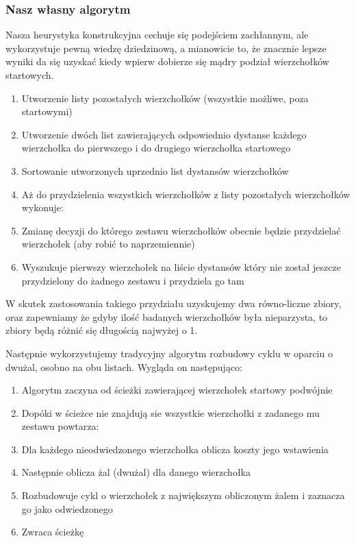 \documentclass[11pt]{article}
\begin{document}
\subsubsection{Nasz własny algorytm}\label{subsubsec:nasz-wasny-algorytm}

Nasza heurystyka konstrukcyjna cechuje się podejściem zachłannym, ale wykorzystuje pewną wiedzę dziedzinową,
a mianowicie to, że znacznie lepsze wyniki da się uzyskać kiedy wpierw dobierze się mądry podział wierzchołków startowych.

\begin{enumerate}
    \item Utworzenie listy pozostałych wierzchołków (wszystkie możliwe, poza startowymi)
    \item Utworzenie dwóch list zawierających odpowiednio dystanse każdego wierzchołka do pierwszego i do drugiego wierzchołka startowego
    \item Sortowanie utworzonych uprzednio list dystansów wierzchołków
    \item Aż do przydzielenia wszystkich wierzchołków z listy pozostałych wierzchołków wykonuje:
    \item Zmianę decyzji do którego zestawu wierzchołków obecnie będzie przydzielać wierzchołek (aby robić to naprzemiennie)
    \item Wyszukuje pierwszy wierzchołek na liście dystansów który nie został jeszcze przydzielony do żadnego zestawu i przydziela go tam
\end{enumerate}

W skutek zastosowania takiego przydziału uzyskujemy dwa równo-liczne zbiory, oraz zapewniamy że gdyby ilość badanych wierzchołków była nieparzysta, to zbiory będą różnić się długością najwyżej o 1.

Następnie wykorzystujemy tradycyjny algorytm rozbudowy cyklu w oparciu o dwużal, osobno na obu listach.
Wygląda on następująco:

\begin{enumerate}
    \item Algorytm zaczyna od ścieżki zawierającej wierzchołek startowy podwójnie
    \item Dopóki w ścieżce nie znajdują sie wszystkie wierzchołki z zadanego mu zestawu powtarza:
    \item Dla każdego nieodwiedzonego wierzchołka oblicza koszty jego wstawienia
    \item Następnie oblicza żal (dwużal) dla danego wierzchołka
    \item Rozbudowuje cykl o wierzchołek z największym obliczonym żalem i zaznacza go jako odwiedzonego
    \item Zwraca ścieżkę
\end{enumerate}
\end{document}

